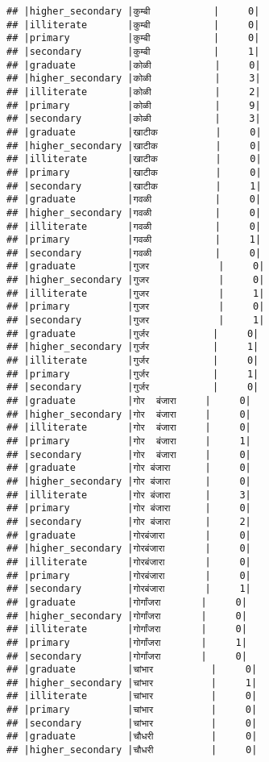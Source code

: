 \documentclass[
]{article}
\begin{document}
\begin{verbatim}
## |higher_secondary |कुम्बी           |     0|
## |illiterate       |कुम्बी           |     0|
## |primary          |कुम्बी           |     0|
## |secondary        |कुम्बी           |     1|
## |graduate         |कोळी           |     0|
## |higher_secondary |कोळी           |     3|
## |illiterate       |कोळी           |     2|
## |primary          |कोळी           |     9|
## |secondary        |कोळी           |     3|
## |graduate         |खाटीक          |     0|
## |higher_secondary |खाटीक          |     0|
## |illiterate       |खाटीक          |     0|
## |primary          |खाटीक          |     0|
## |secondary        |खाटीक          |     1|
## |graduate         |गवळी           |     0|
## |higher_secondary |गवळी           |     0|
## |illiterate       |गवळी           |     0|
## |primary          |गवळी           |     1|
## |secondary        |गवळी           |     0|
## |graduate         |गुजर            |     0|
## |higher_secondary |गुजर            |     0|
## |illiterate       |गुजर            |     1|
## |primary          |गुजर            |     0|
## |secondary        |गुजर            |     1|
## |graduate         |गुर्जर           |     0|
## |higher_secondary |गुर्जर           |     1|
## |illiterate       |गुर्जर           |     0|
## |primary          |गुर्जर           |     1|
## |secondary        |गुर्जर           |     0|
## |graduate         |गोर  बंजारा     |     0|
## |higher_secondary |गोर  बंजारा     |     0|
## |illiterate       |गोर  बंजारा     |     0|
## |primary          |गोर  बंजारा     |     1|
## |secondary        |गोर  बंजारा     |     0|
## |graduate         |गोर बंजारा      |     0|
## |higher_secondary |गोर बंजारा      |     0|
## |illiterate       |गोर बंजारा      |     3|
## |primary          |गोर बंजारा      |     0|
## |secondary        |गोर बंजारा      |     2|
## |graduate         |गोरबंजारा       |     0|
## |higher_secondary |गोरबंजारा       |     0|
## |illiterate       |गोरबंजारा       |     0|
## |primary          |गोरबंजारा       |     0|
## |secondary        |गोरबंजारा       |     1|
## |graduate         |गोर्गांजरा       |     0|
## |higher_secondary |गोर्गांजरा       |     0|
## |illiterate       |गोर्गांजरा       |     0|
## |primary          |गोर्गांजरा       |     1|
## |secondary        |गोर्गांजरा       |     0|
## |graduate         |चांभार          |     0|
## |higher_secondary |चांभार          |     1|
## |illiterate       |चांभार          |     0|
## |primary          |चांभार          |     0|
## |secondary        |चांभार          |     0|
## |graduate         |चौधरी          |     0|
## |higher_secondary |चौधरी          |     0|

\end{verbatim}
\end{document}
